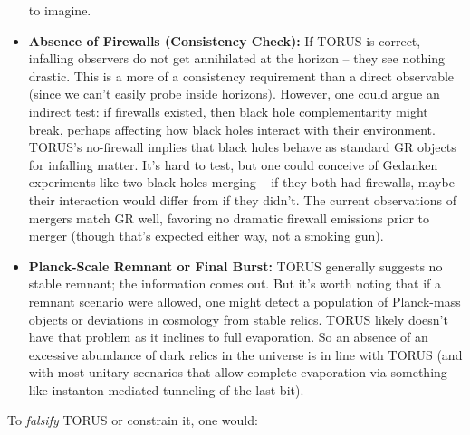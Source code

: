 \documentclass[]{article}
\begin{document}
\begin{itemize}
  to imagine.
\item
  \textbf{Absence of Firewalls (Consistency Check):} If TORUS is
  correct, infalling observers do not get annihilated at the horizon --
  they see nothing drastic. This is a more of a consistency requirement
  than a direct observable (since we can't easily probe inside
  horizons). However, one could argue an indirect test: if firewalls
  existed, then black hole complementarity might break, perhaps
  affecting how black holes interact with their environment. TORUS's
  no-firewall implies that black holes behave as standard GR objects for
  infalling matter. It's hard to test, but one could conceive of
  Gedanken experiments like two black holes merging -- if they both had
  firewalls, maybe their interaction would differ from if they didn't.
  The current observations of mergers match GR well, favoring no
  dramatic firewall emissions prior to merger (though that's expected
  either way, not a smoking gun).
\item
  \textbf{Planck-Scale Remnant or Final Burst:} TORUS generally suggests
  no stable remnant; the information comes out. But it's worth noting
  that if a remnant scenario were allowed, one might detect a population
  of Planck-mass objects or deviations in cosmology from stable relics.
  TORUS likely doesn't have that problem as it inclines to full
  evaporation. So an absence of an excessive abundance of dark relics in
  the universe is in line with TORUS (and with most unitary scenarios
  that allow complete evaporation via something like instanton mediated
  tunneling of the last bit).
\end{itemize}

To \emph{falsify} TORUS or constrain it, one would:
\end{document}
